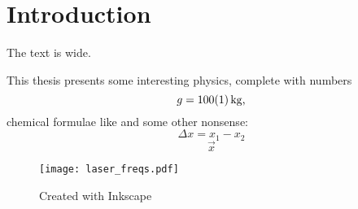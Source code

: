 \chapter{Introduction}\label{ch:introduction}
The text is \the\textwidth {} wide.

This thesis presents some interesting physics, complete with numbers
\begin{equation}
   g = \SI{100+-1}{kg}\text{,}
\end{equation}
chemical formulae like  and some other nonsense:
\begin{equation}
   \Delta x = x_1 - x_2
\end{equation}
\begin{equation}
\vec{x}
\end{equation}

\begin{figure}[tb]
	\centering
		\texttt{[image: laser\_freqs.pdf]}
	\caption{Created with Inkscape}
\end{figure}

